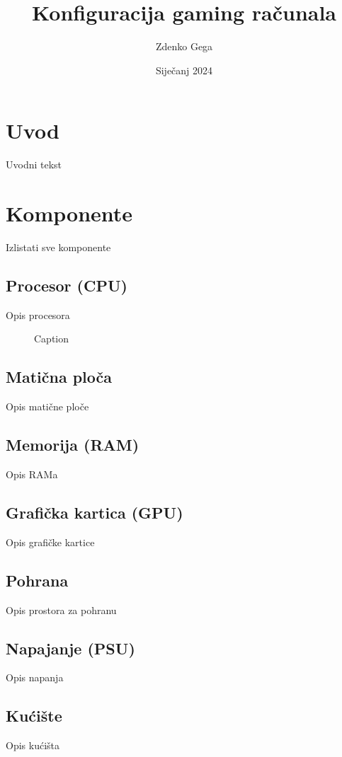 \documentclass{article}
\title{Konfiguracija gaming računala}
\author{Zdenko Gega}
\date{Siječanj 2024}
\begin{document}
\maketitle
\tableofcontents
\clearpage

\section{Uvod}
Uvodni tekst
\clearpage

\section{Komponente}
    Izlistati sve komponente

    \subsection{Procesor (CPU)}
    Opis procesora

    \begin{figure}[H]
        \centering
        \caption{Caption}
        \label{fig:Procesor}
    \end{figure}

    \subsection{Matična ploča}
    Opis matične ploče

    \subsection{Memorija (RAM)}
    Opis RAMa

    \subsection{Grafička kartica (GPU)}
    Opis grafičke kartice

    \subsection{Pohrana}
    Opis prostora za pohranu

    \subsection{Napajanje (PSU)}
    Opis napanja

    \subsection{Kućište}
    Opis kućišta
\end{document}
